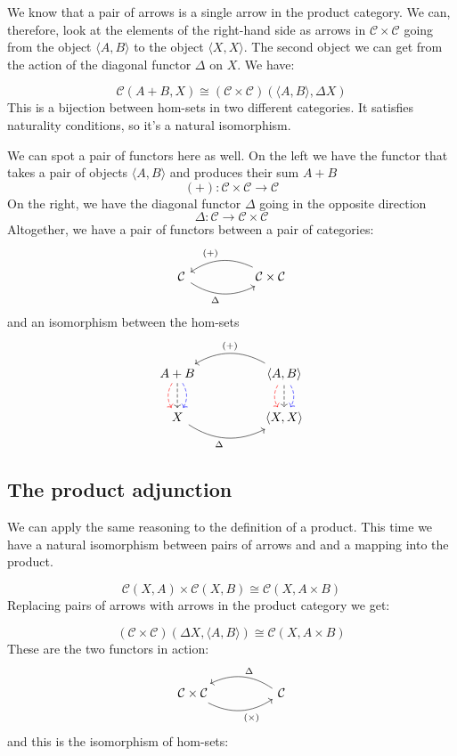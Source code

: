 \documentclass[DaoFP]{subfiles}
\begin{document}
We know that a pair of arrows is a single arrow in the product category. We can, therefore, look at the elements of the right-hand side as arrows in $\mathcal{C} \times \mathcal{C}$ going from the object $\langle A, B \rangle$ to the object $\langle X, X \rangle$. The second object we can get from the action of the diagonal functor $\Delta$ on $X$. We have:

\[  \mathcal{C} (A + B, X) \cong (\mathcal{C} \times \mathcal{C})( \langle A, B \rangle , \Delta X)\]
This is a bijection between hom-sets in two different categories. It satisfies naturality conditions, so it's a natural isomorphism. 

We can spot a pair of functors here as well. On the left we have the functor that takes a pair of objects $\langle A, B \rangle$ and produces their sum $A + B$
\[ (+) \colon \mathcal{C} \times \mathcal{C} \to \mathcal{C}\]
On the right, we have the diagonal functor $\Delta$ going in the opposite direction
\[ \Delta \colon \mathcal{C} \to  \mathcal{C} \times \mathcal{C} \]
Altogether, we have a pair of functors between a pair of categories:
\[
 \begin{tikzcd}
  \mathcal{C}
   \arrow[rr, bend right, "\Delta"']
  &&
  \mathcal{C} \times \mathcal{C}
 \arrow[ll, bend right, "(+)"']
  \end{tikzcd}
\]
and an isomorphism between the hom-sets
\[
 \begin{tikzcd}
A + B
\arrow[d, bend right, red, dashed]
\arrow[d, dashed]
\arrow[d, bend left, blue, dashed]
  &&
 \langle A , B \rangle
\arrow[d, bend right, red, dashed]
\arrow[d, dashed]
\arrow[d, bend left, blue, dashed]
 \arrow[ll, bend right, "(+)"']
 \\
 X
   \arrow[rr, bend right, "\Delta"']
 &&
 \langle X, X \rangle
  \end{tikzcd}
\]


\subsection{The product adjunction}

We can apply the same reasoning to the definition of a product. This time we have a natural isomorphism between pairs of arrows and and a mapping into the product.

\[  \mathcal{C} (X, A) \times \mathcal{C}(X, B) \cong  \mathcal{C} (X, A \times B)  \]
Replacing pairs of arrows with arrows in the product category we get:

\[  (\mathcal{C} \times \mathcal{C})( \Delta X,  \langle A, B \rangle ) \cong  \mathcal{C} (X, A \times B)  \]
These are the two functors in action:
\[
 \begin{tikzcd}
  \mathcal{C} \times \mathcal{C}
  \arrow[rr, bend right, "(\times)"']
  &&
  \mathcal{C}
  \arrow[ll, bend right, "\Delta"']
  \end{tikzcd}
\]
and this is the isomorphism of hom-sets:
\end{document}
